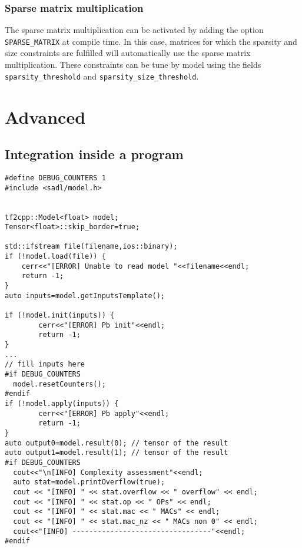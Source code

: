 \documentclass[10pt,a4paper]{article}
\begin{document}
\subsubsection{Sparse matrix multiplication}
The sparse matrix multiplication can be activated by adding the option \texttt{SPARSE\_MATRIX} at compile time. In this case, matrices for which the sparsity and size constraints are fulfilled will automatically use the sparse matrix multiplication. These constraints can be tune by model using the fields \texttt{sparsity\_threshold} and \texttt{sparsity\_size\_threshold}.

\section{Advanced}
\subsection{Integration inside a program}
\begin{lstlisting}[caption={Model inference in C++},style=codec]
#define DEBUG_COUNTERS 1 
#include <sadl/model.h>


tf2cpp::Model<float> model;
Tensor<float>::skip_border=true; 

std::ifstream file(filename,ios::binary);
if (!model.load(file)) {
    cerr<<"[ERROR] Unable to read model "<<filename<<endl;
    return -1;
}
auto inputs=model.getInputsTemplate();

if (!model.init(inputs)) {
        cerr<<"[ERROR] Pb init"<<endl;
        return -1;
}
...
// fill inputs here
#if DEBUG_COUNTERS
  model.resetCounters();
#endif
if (!model.apply(inputs)) {
        cerr<<"[ERROR] Pb apply"<<endl;
        return -1;
}
auto output0=model.result(0); // tensor of the result
auto output1=model.result(1); // tensor of the result
#if DEBUG_COUNTERS
  cout<<"\n[INFO] Complexity assessment"<<endl;
  auto stat=model.printOverflow(true);
  cout << "[INFO] " << stat.overflow << " overflow" << endl;
  cout << "[INFO] " << stat.op << " OPs" << endl;
  cout << "[INFO] " << stat.mac << " MACs" << endl;
  cout << "[INFO] " << stat.mac_nz << " MACs non 0" << endl;
  cout<<"[INFO] ---------------------------------"<<endl;
#endif

\end{lstlisting}
\end{document}

